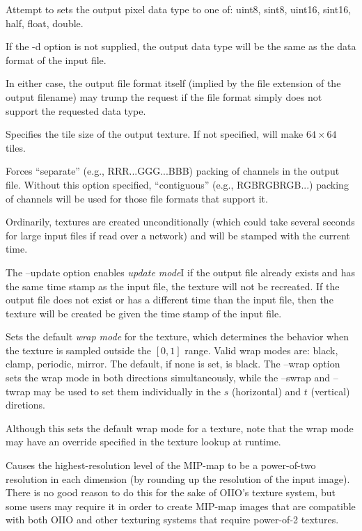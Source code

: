 Attempt to sets the output pixel data type to one of: {\cf uint8}, 
{\cf sint8}, {\cf uint16}, {\cf sint16}, {\cf half}, {\cf float}, 
{\cf double}.

If the {\cf -d} option is not supplied, the output data type will
be the same as the data format of the input file.

In either case, the output file format itself (implied by the file
extension of the output filename) may trump the request if the file
format simply does not support the requested data type.
\apiend

Specifies the tile size of the output texture.  If not specified,
\maketx will make $64 \times 64$ tiles.
\apiend

Forces ``separate'' (e.g., RRR...GGG...BBB) packing of channels in the
output file.  Without this option specified, ``contiguous'' (e.g.,
RGBRGBRGB...) packing of channels will be used for those file formats
that support it.
\apiend

Ordinarily, textures are created unconditionally (which could take
several seconds for large input files if read over a network) and will
be stamped with the current time.

The {\cf --update} option enables \emph{update mode}I if the output file
already exists and has the same time stamp as the input file, the
texture will not be recreated.  If the output file does not exist or has
a different time than the input file, then the texture will be created
be given the time stamp of the input file.
\apiend

Sets the default \emph{wrap mode} for the texture, which determines
the behavior when the texture is sampled outside the $[0,1]$ range.
Valid wrap modes are: {\cf black}, {\cf clamp}, {\cf periodic},
{\cf mirror}.  The default, if none is set, is {\cf black}.  The
{\cf --wrap} option sets the wrap mode in both directions
simultaneously, while the {\cf --swrap} and {\cf --twrap} may be used to
set them individually in the $s$ (horizontal) and $t$ (vertical)
diretions.

Although this sets the default wrap mode for a texture, note that
the wrap mode may have an override specified in the texture lookup
at runtime.
\apiend

Causes the highest-resolution level of the MIP-map to be a
power-of-two resolution in each dimension
(by rounding up the resolution of the input image).  There is no
good reason to do this for the sake of OIIO's texture system, but 
some users may require it in order to create MIP-map images
that are compatible with both OIIO and other texturing systems that
require power-of-2 textures.
\apiend

